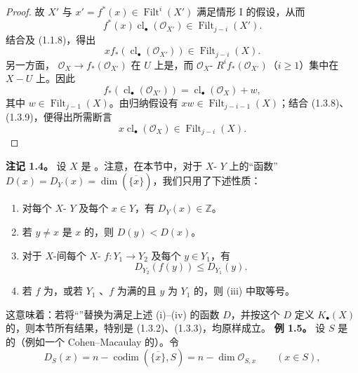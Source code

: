 \begin{proof}
故 $X'$ 与 $x'=f^*(x)\in\operatorname{Filt}^i(X')$ 满足情形 I 的假设，从而
\[f^*(x)\operatorname{cl}_\bullet(\mathcal O_{X'})\in\operatorname{Filt}_{j-i}(X').\tag{1.3.7'}\]
结合及 (1.1.8)，得出
\[x f_*(\operatorname{cl}_\bullet(\mathcal O_{X'}))\in\operatorname{Filt}_{j-i}(X).\tag{1.3.8}\]
另一方面， $\mathcal O_X\longrightarrow f_*(\mathcal O_{X'})$ 在 $U$ 上是，而 $\mathcal O_X$- $R^if_*(\mathcal O_{X'})$（$i\geq1$）集中在 $X-U$ 上。因此
\[f_*(\operatorname{cl}_\bullet(\mathcal O_{X'}))=\operatorname{cl}_\bullet(\mathcal O_X)+w,\tag{1.3.9}\]
其中 $w\in\operatorname{Filt}_{j-1}(X)$。由归纳假设有 $xw\in\operatorname{Filt}_{j-i-1}(X)$；结合 (1.3.8)、(1.3.9)，便得出所需断言
\[x\operatorname{cl}_\bullet(\mathcal O_X)\in\operatorname{Filt}_{j-i}(X).\]
\end{proof}
\textbf{注记 1.4。} 设 $X$ 是  。注意，在本节中，对于 $X$- $Y$ 上的“函数” $D(x)=D_Y(x)=\dim(\overline{\{x\}})$，我们只用了下述性质：
\begin{enumerate}
\item[(i)] 对每个 $X$- $Y$ 及每个 $x\in Y$，有 $D_Y(x)\in\mathbb Z$。
\item[(ii)] 若 $y\ne x$ 是 $x$ 的，则 $D(y)<D(x)$。
\item[(iii)] 对于 $X$-间每个 $X$- $f:Y_1\longrightarrow Y_2$ 及每个 $y\in Y_1$，有
\[D_{Y_2}(f(y))\leq D_{Y_1}(y).\]
\item[(iv)] 若 $f$ 为，或若 $Y_1$ 、$f$ 为满的且 $y$ 为 $Y_1$ 的，则 (iii) 中取等号。
\end{enumerate}
这意味着：若将“”替换为满足上述 (i)--(iv) 的函数 $D$，并按这个 $D$ 定义 $K_\bullet(X)$ 的，则本节所有结果，特别是 (1.3.2)、(1.3.3)，均原样成立。
\textbf{例 1.5。} 设 $S$ 是  的（例如一个 Cohen--Macaulay 的）。令
\[D_S(x)=n-\operatorname{codim}(\overline{\{x\}},S)=n-\dim\mathcal O_{S,x}\qquad(x\in S),\tag{1.5.1}\]

